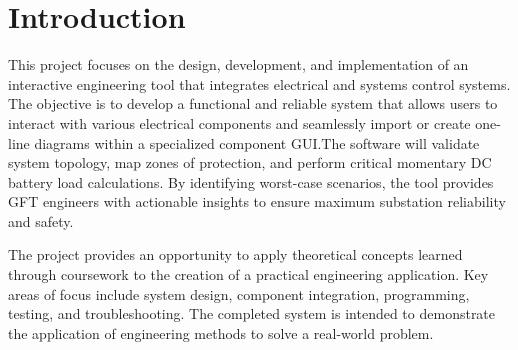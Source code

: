 \documentclass{article}
\begin{document}
\section{Introduction}
This project focuses on the design, development, and implementation of an
interactive engineering tool that integrates electrical and systems control
systems. The objective is to develop a functional and reliable system
that allows users to interact with various electrical components and seamlessly import
or create one-line diagrams within a specialized component GUI.The software will validate 
system topology, map zones of protection, and perform critical momentary DC battery load 
calculations. By identifying worst-case scenarios, the tool provides GFT engineers with 
actionable insights to ensure maximum substation reliability and safety.


The project provides an opportunity to apply theoretical concepts learned
through coursework to the creation of a practical engineering application. Key areas of
focus include system design, component integration, programming, testing,
and troubleshooting. The completed system is intended to demonstrate the
application of engineering methods to solve a real-world problem.
\end{document}
